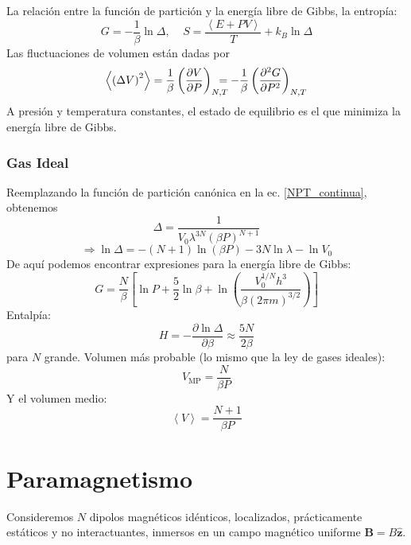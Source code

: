 \documentclass[]{article}
\numberwithin{equation}{section}
\newcommand{\deriv}[3]{\left(\frac{\partial #1}{\partial #2} \right)_{#3}}
\newcommand{\0}{\textcolor{gray}{0}}
\newcommand{\zv}{\mathbf{z}}
\newcommand{\zhat}{\hat{\zv}}
\newcommand{\pd}[2]{\dfrac{\partial #1}{\partial #2}}
\newcommand{\n}[1]{\mathbf{#1}}
\newcommand{\pr}[1]{\left\langle #1 \right\rangle }
\begin{document}
La relación entre la función de partición y la energía libre de Gibbs, la entropía:
\begin{equation}
	G = -\frac{1}{\beta} \ln\Delta, ~~~~~ S = \frac{\left\langle E + PV \right\rangle }{T} + k_B \ln\Delta
\end{equation}
Las fluctuaciones de volumen están dadas por
\begin{equation}
	\pr{\left(\Delta V\right)^2} = \frac{1}{\beta} \deriv{V}{P}{N,T} \hspace{-4mm} = - \frac{1}{\beta} \deriv{^2 G}{P^2}{N,T}
\end{equation}
A presión y temperatura constantes, el estado de equilibrio es el que minimiza la energía libre de Gibbs.

\subsubsection{Gas Ideal}
Reemplazando la función de partición canónica en la ec. \ref{NPT_continua}, obtenemos
\begin{equation}
	\Delta = \frac{1}{V_0 \lambda^{3N} (\beta P)^{N+1}}
\end{equation}
\begin{equation}
	\Rightarrow\ln\Delta = -(N+1)\ln(\beta P) - 3N \ln\lambda - \ln V_0
\end{equation}
De aquí podemos encontrar expresiones para la energía libre de Gibbs:
\begin{equation}
	G = \frac{N}{\beta} \left[\ln P + \frac{5}{2}\ln\beta + \ln\left(\frac{V_0^{1/N} h^3}{\beta (2\pi m)^{3/2}}\right)\right]
\end{equation}
Entalpía:
\begin{equation}
	H = - \pd{\ln\Delta}{\beta} \approx \frac{5 N}{2\beta}
\end{equation}
para \(N\) grande. Volumen más probable (lo mismo que la ley de gases ideales):
\begin{equation*}
	V_\mathrm{MP} = \frac{N}{\beta P}
\end{equation*}
Y el volumen medio:
\begin{equation*}
	\pr{V} = \frac{N + 1}{\beta P}
\end{equation*}

\section{Paramagnetismo}
Consideremos $N$ dipolos magnéticos idénticos, localizados, prácticamente estáticos y no interactuantes, inmersos en un campo magnético uniforme $\n{B} = B\zhat$.
\end{document}
